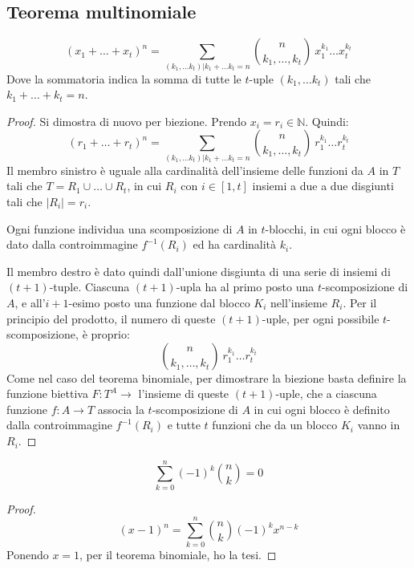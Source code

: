 \subsection{Teorema multinomiale}
\begin{prop}
\[
(x_1 + \dots + x_t)^n = \sum_{(k_1, \dots k_t) | k_1 + \dots k_t = n}
\binom{n}{k_1, \dots, k_t} \ x_1^{k_1} \dots x_t^{k_t}
\]
Dove la sommatoria indica la somma di tutte le $t$-uple $(k_1, \dots k_t)$ tali che $k_1 + \dots + k_t = n$.
\end{prop}
\begin{proof}
Si dimostra di nuovo per biezione. Prendo $x_i = r_i \in \mathbb{N}$. Quindi:
\[
(r_1 + \dots + r_t)^n = \sum_{(k_1, \dots k_t) | k_1 + \dots k_t = n}
\binom{n}{k_1, \dots, k_t} \ r_1^{k_1} \dots r_t^{k_t}
\]
Il membro sinistro \`e uguale alla cardinalit\`a dell'insieme delle funzioni da $A$ in $T$ tali che $T = R_1 \cup \dots \cup R_t$, in cui $R_i $ con $i \in [1, t]$ insiemi a due a due disgiunti tali che $| R_i | = r_i$.

Ogni funzione individua una scomposizione di $A$ in $t$-blocchi, in cui ogni blocco \`e dato dalla controimmagine $f^{-1} (R_i)$ ed ha cardinalit\`a $k_i$. 

Il membro destro \`e dato quindi dall'unione disgiunta di una serie di insiemi di $(t+1)$-tuple. Ciascuna $(t+1)$-upla ha al primo posto una $t$-scomposizione di $A$, e all'$i+1$-esimo posto una funzione dal blocco $K_i$ nell'insieme $R_i$. Per il principio del prodotto, il numero di queste $(t+1)$-uple, per ogni possibile $t$-scomposizione, \`e proprio:
\[
\binom{n}{k_1, \dots, k_t} \ r_1^{k_1} \dots r_t^{k_t}
\]
Come nel caso del teorema binomiale, per dimostrare la biezione basta definire la funzione biettiva $F : T^A \to$ l'insieme di queste $(t+1)$-uple, che a ciascuna funzione $f : A \to T$ associa la $t$-scomposizione di $A$ in cui ogni blocco \`e definito dalla controimmagine $f^{-1} (R_i)$ e tutte $t$ funzioni che da un blocco $K_i$ vanno in $R_i$.
\end{proof}


\begin{cor}
\[
\sum_{k = 0}^{n} (-1)^k \binom{n}{k} = 0
\]
\end{cor}
\begin{proof}
\[
(x - 1)^n = \sum_{k = 0}^{n} \binom{n}{k} (-1)^k x^{n-k}
\]
Ponendo $x = 1$, per il teorema binomiale, ho la tesi.
\end{proof}

